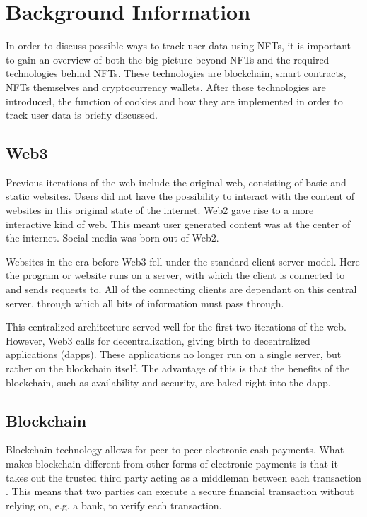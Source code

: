 \chapter{Background Information}
\label{ch:background}
In order to discuss possible ways to track user data using NFTs, it is important to gain an overview of both the big picture beyond NFTs and the required technologies behind NFTs. These technologies are blockchain, smart contracts, NFTs themselves and cryptocurrency wallets. After these technologies are introduced, the function of cookies and how they are implemented in order to track user data is briefly discussed.




%
%
\section{Web3}
\label{sec:background:web3}
Previous iterations of the web include the original web, consisting of basic and static websites. Users did not have the possibility to interact with the content of websites in this original state of the internet. Web2 gave rise to a more interactive kind of web. This meant user generated content was at the center of the internet. Social media was born out of Web2. \cite{previousWebIterations}


Websites in the era before Web3 fell under the standard client-server model. Here the program or website runs on a server, with which the client is connected to and sends requests to. All of the connecting clients are dependant on this central server, through which all bits of information must pass through. \cite{dapps}

This centralized architecture served well for the first two iterations of the web. However, Web3 calls for decentralization, giving birth to decentralized applications (dapps). These applications no longer run on a single server, but rather on the blockchain itself. The advantage of this is that the benefits of the blockchain, such as availability and security, are baked right into the dapp. \cite{dapps}


%
%
\section{Blockchain}
\label{sec:background:blockchain}
Blockchain technology allows for peer-to-peer electronic cash payments. What makes blockchain different from other forms of electronic payments is that it takes out the trusted third party acting as a middleman between each transaction \cite{bitcoin}. This means that two parties can execute a secure financial transaction without relying on, e.g. a bank, to verify each transaction.


